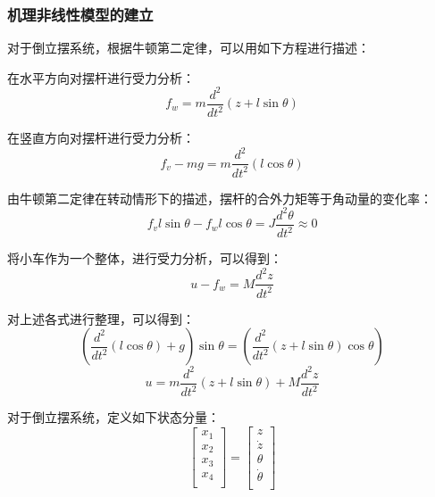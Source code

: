 \documentclass[UTF8]{article}
\begin{document}
\subsubsection{机理非线性模型的建立}
对于倒立摆系统，根据牛顿第二定律，可以用如下方程进行描述：

\noindent 在水平方向对摆杆进行受力分析：
\begin{equation*}
	f_w = m\frac{d^2}{dt^2}(z + l\sin\theta) 
\end{equation*}

在竖直方向对摆杆进行受力分析：
\begin{equation*}
	f_v - mg = m\frac{d^2}{dt^2}(l\cos\theta) 
\end{equation*}

由牛顿第二定律在转动情形下的描述，摆杆的合外力矩等于角动量的变化率：
\begin{equation*}
	f_v l\sin\theta - f_w l\cos\theta = J\frac{d^2\theta}{dt^2} \approx 0
\end{equation*}

将小车作为一个整体，进行受力分析，可以得到：
\begin{equation*}
	u - f_w = M\frac{d^2z}{dt^2}
\end{equation*}

对上述各式进行整理，可以得到：
\begin{equation*}
	(\frac{d^2}{dt^2}(l\cos\theta) + g)\sin\theta = (\frac{d^2}{dt^2}(z + l\sin\theta)\cos\theta)
\end{equation*}
\begin{equation*}
	u = m\frac{d^2}{dt^2}(z + l\sin\theta) + M\frac{d^2z}{dt^2}
\end{equation*}

对于倒立摆系统，定义如下状态分量：
\begin{equation*}
	\begin{bmatrix}
		x_1 \\
		x_2 \\
		x_3 \\
		x_4 \\
	\end{bmatrix} = 
	\begin{bmatrix}
		z \\
		\dot{z} \\
		\theta \\
		\dot{\theta} \\
	\end{bmatrix}
\end{equation*}
\end{document}
